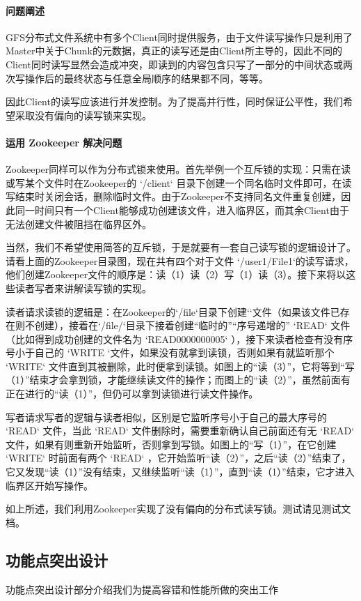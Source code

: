 \documentclass[UTF8]{ctexart}
\begin{document}
\paragraph{问题阐述}
GFS分布式文件系统中有多个Client同时提供服务，由于文件读写操作只是利用了Master中关于Chunk的元数据，真正的读写还是由Client所主导的，因此不同的Client同时读写显然会造成冲突，即读到的内容包含只写了一部分的中间状态或两次写操作后的最终状态与任意全局顺序的结果都不同，等等。

因此Client的读写应该进行并发控制。为了提高并行性，同时保证公平性，我们希望采取没有偏向的读写锁来实现。
\paragraph{运用 Zookeeper 解决问题}
Zookeeper同样可以作为分布式锁来使用。首先举例一个互斥锁的实现：只需在读或写某个文件时在Zookeeper的 `/client` 目录下创建一个同名临时文件即可，在读写结束时关闭会话，删除临时文件。由于Zookeeper不支持同名文件重复创建，因此同一时间只有一个Client能够成功创建该文件，进入临界区，而其余Client由于无法创建文件被阻挡在临界区外。

当然，我们不希望使用简答的互斥锁，于是就要有一套自己读写锁的逻辑设计了。请看上面的Zookeeper目录图，现在共有四个对于文件 `/user1/File1`的读写请求，他们创建Zookeeper文件的顺序是：读（1）读（2）写（1）读（3）。接下来将以这些读者写者来讲解读写锁的实现。

读者请求读锁的逻辑是：在Zookeeper的`/file`目录下创建``文件（如果该文件已存在则不创建），接着在`/file/`目录下接着创建“临时的”“序号递增的” `READ` 文件（比如得到成功创建的文件名为 `READ0000000005` ），接下来读者检查有没有序号小于自己的 `WRITE `文件，如果没有就拿到读锁，否则如果有就监听那个 `WRITE` 文件直到其被删除，此时便拿到读锁。如图上的“读（3）”，它将等到“写（1）”结束才会拿到锁，才能继续读文件的操作；而图上的“读（2）”，虽然前面有正在进行的“读（1）”，但仍可以拿到读锁进行读文件操作。

写者请求写者的逻辑与读者相似，区别是它监听序号小于自己的最大序号的 `READ` 文件，当此 `READ` 文件删除时，需要重新确认自己前面还有无 `READ` 文件，如果有则重新开始监听，否则拿到写锁。如图上的“写（1）”，在它创建 `WRITE` 时前面有两个 `READ` ，它开始监听“读（2）”，之后“读（2）”结束了，它又发现“读（1）”没有结束，又继续监听“读（1）”，直到“读（1）”结束，它才进入临界区开始写操作。

如上所述，我们利用Zookeeper实现了没有偏向的分布式读写锁。测试请见测试文档。
\subsection{功能点突出设计}
功能点突出设计部分介绍我们为提高容错和性能所做的突出工作
\end{document}
